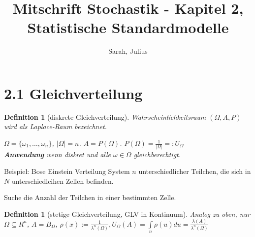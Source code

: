 \documentclass[a4paper,12pt]{article}%
\title{Mitschrift Stochastik - Kapitel 2, Statistische Standardmodelle}
\author{Sarah, Julius}
\newtheorem{myDef}[thm]{Definition}
\newcommand{\invisible}[1]{#1}
\begin{document}
	\maketitle
	\newpage
	\section{2.1 Gleichverteilung }
	
	\begin{myDef}[diskrete Gleichverteilung]
		
		Wahrscheinlichkeitsraum $(\Omega, A, P)$ wird als Laplace-Raum bezeichnet.
		
		$\Omega = \{\omega_1, \dots, \omega_n\}$, $| \Omega | = n$. $A = P(\Omega)$. $P(\Omega) = \frac{1}{|\Omega|} =: U_\Omega$\\
		{\bf Anwendung} wenn diskret und alle $\omega \in \Omega$ gleichberechtigt.
		
	\end{myDef}
	
	\invisible{
		
		Beispiel: Bose Einstein Verteilung
		System $n$ unterschiedlicher Teilchen, die sich in $N$ unterschiedlcihen Zellen befinden. 
		
		Suche die Anzahl der Teilchen in einer bestimmten Zelle.
		}
	
	
	
	
	
	
	
	\begin{myDef}[stetige Gleichverteilung, GLV in Kontinuum]
		
		Analog zu oben, nur $\Omega \subseteq R^n$, $A = B_{\Omega}$, $\rho(x):= \frac{1}{\lambda^n(\Omega)}, U_\Omega(A) = \int \limits_{n} \rho (u) d u = \frac{\lambda(A)}{\lambda^n(\Omega)}$
	\end{myDef}
	
	
\end{document}
